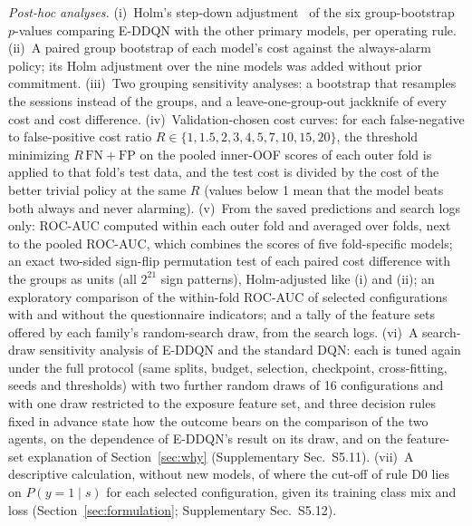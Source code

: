 \emph{Post-hoc analyses.} (i)~Holm's step-down adjustment~\cite{holm1979simple} of the six group-bootstrap $p$-values comparing E-DDQN with the other primary models, per operating rule. (ii)~A paired group bootstrap of each model's cost against the always-alarm policy; its Holm adjustment over the nine models was added without prior commitment. (iii)~Two grouping sensitivity analyses: a bootstrap that resamples the \nSessionsEval{} sessions instead of the \nGroupsEval{} groups, and a leave-one-group-out jackknife of every cost and cost difference. (iv)~Validation-chosen cost curves: for each false-negative to false-positive cost ratio $R\in\{1,1.5,2,3,4,5,7,10,15,20\}$, the threshold minimizing $R\,\mathrm{FN}+\mathrm{FP}$ on the pooled inner-OOF scores of each outer fold is applied to that fold's test data, and the test cost is divided by the cost of the better trivial policy at the same $R$ (values below 1 mean that the model beats both always and never alarming). (v)~From the saved predictions and search logs only: ROC-AUC computed within each outer fold and averaged over folds, next to the pooled ROC-AUC, which combines the scores of five fold-specific models; an exact two-sided sign-flip permutation test of each paired cost difference with the \nGroupsEval{} groups as units (all $2^{21}$ sign patterns), Holm-adjusted like (i) and (ii); an exploratory comparison of the within-fold ROC-AUC of selected configurations with and without the questionnaire indicators; and a tally of the feature sets offered by each family's random-search draw, from the search logs. (vi)~A search-draw sensitivity analysis of E-DDQN and the standard DQN: each is tuned again under the full protocol (same splits, budget, selection, checkpoint, cross-fitting, seeds and thresholds) with two further random draws of 16 configurations and with one draw restricted to the exposure feature set, and three decision rules fixed in advance state how the outcome bears on the comparison of the two agents, on the dependence of E-DDQN's result on its draw, and on the feature-set explanation of Section~\ref{sec:why} (Supplementary Sec.~S5.11). (vii)~A descriptive calculation, without new models, of where the cut-off of rule D0 lies on $P(y=1\mid s)$ for each selected configuration, given its training class mix and loss (Section~\ref{sec:formulation}; Supplementary Sec.~S5.12).

